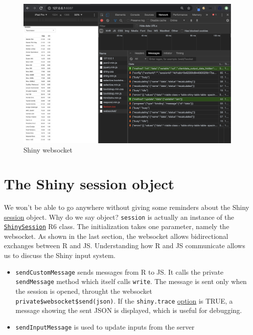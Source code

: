 \documentclass[]{book}
\providecommand{\tightlist}{%
  \setlength{\itemsep}{0pt}\setlength{\parskip}{0pt}}
\begin{document}
\begin{figure}
\includegraphics[width=27.69in]{images/survival-kit/shiny-websocket} \caption{Shiny websocket}\label{fig:shiny-websocket}
\end{figure}

\hypertarget{the-shiny-session-object}{%
\section{The Shiny session object}\label{the-shiny-session-object}}

We won't be able to go anywhere without giving some reminders about the Shiny \href{https://shiny.rstudio.com/reference/shiny/1.4.0/session.html}{session} object. Why do we say object? \texttt{session} is actually an instance of the \href{https://github.com/rstudio/shiny/blob/master/R/shiny.R}{\texttt{ShinySession}} R6 class.
The initialization takes one parameter, namely the websocket. As shown in the last section, the websocket allows bidirectional exchanges between R and JS. Understanding how R and JS communicate allows us to discuss the Shiny input system.

\begin{itemize}
\tightlist
\item
  \texttt{sendCustomMessage} sends messages from R to JS. It calls the private \texttt{sendMessage} method which itself calls \texttt{write}. The message is sent only when the session is opened, throught the websocket \texttt{private\$websocket\$send(json)}. If the \texttt{shiny.trace} \href{https://shiny.rstudio.com/reference/shiny/0.14/shiny-options.html}{option} is TRUE, a message showing the sent JSON is displayed, which is useful for debugging.
\item
  \texttt{sendInputMessage} is used to update inputs from the server
\end{itemize}
\end{document}
